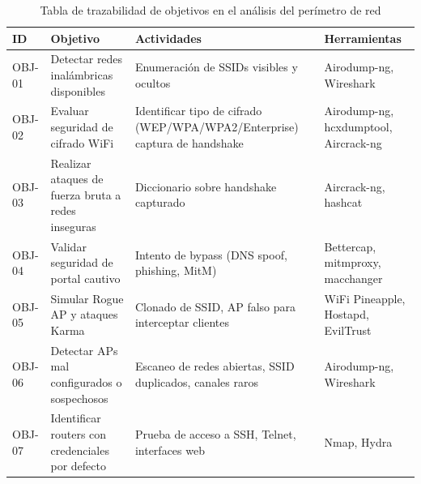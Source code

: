 \documentclass[a4paper, 10pt]{article}
\begin{document}
\begin{table}[H]
    \centering
    \renewcommand{\arraystretch}{1.4}
    \begin{tabular}{|p{1.2cm}|p{3.9cm}|p{5.3cm}|p{4.2cm}|}
    \hline
    \textbf{ID} & \textbf{Objetivo} & \textbf{Actividades} & \textbf{Herramientas}\\
    \hline
    OBJ-01 & Detectar redes inalámbricas disponibles & Enumeración de SSIDs visibles y ocultos & Airodump-ng, Wireshark\\
    \hline
    OBJ-02 & Evaluar seguridad de cifrado WiFi & Identificar tipo de cifrado (WEP/WPA/WPA2/Enterprise) captura de handshake & Airodump-ng, hcxdumptool, Aircrack-ng \\
    \hline
    OBJ-03 & Realizar ataques de fuerza bruta a redes inseguras & Diccionario sobre handshake capturado & Aircrack-ng, hashcat \\
    \hline
    OBJ-04 & Validar seguridad de portal cautivo & Intento de bypass (DNS spoof, phishing, MitM) & Bettercap, mitmproxy, macchanger\\
    \hline
    OBJ-05 & Simular Rogue AP y ataques Karma & Clonado de SSID, AP falso para interceptar clientes & WiFi Pineapple, Hostapd, EvilTrust \\
    \hline
    OBJ-06 & Detectar APs mal configurados o sospechosos & Escaneo de redes abiertas, SSID duplicados, canales raros & Airodump-ng, Wireshark\\
    \hline
    OBJ-07 & Identificar routers con credenciales por defecto & Prueba de acceso a SSH, Telnet, interfaces web & Nmap, Hydra \\
    \hline
    \end{tabular}
    \caption{Tabla de trazabilidad de objetivos en el análisis del perímetro de red}
    \end{table}
    
\end{document}
